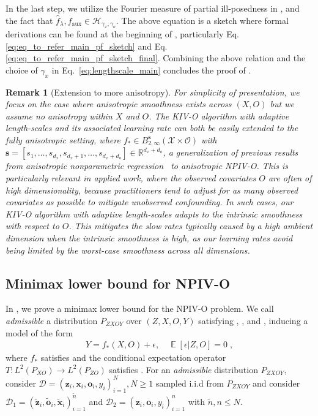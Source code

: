 \documentclass[11pt]{article}
\newcommand{\bx}{\mathbf x}
\newcommand{\bz}{\mathbf z}
\newcommand{\bo}{\mathbf o}
\newcommand{\calH}{\mathcal{H}}
\newcommand{\calO}{\mathcal{O}}
\newcommand{\calX}{\mathcal{X}}
\newcommand{\R}{\mathbb{R}}
\newcommand{\0}{\mathbf{0}}
\newcommand{\bs}{\boldsymbol{s}}
\DeclareMathOperator{\E}{\mathbb{E}}
\newtheorem{rem}{Remark}[section]
\begin{document}
In the last step, we utilize the Fourier measure of partial ill-posedness in , and the fact that $\hat{f}_{\lambda}, f_{\mathrm{aux}} \in \calH_{\gamma_x,\gamma_o}$.
The above equation is a sketch where formal derivations can be found at the beginning of , particularly Eq. \eqref{eq:eq_to_refer_main_pf_sketch} and Eq. \eqref{eq:eq_to_refer_main_pf_sketch_final}. 
Combining the above relation and the choice of $\gamma_x$ in Eq.~\eqref{eq:lengthscale_main} concludes the proof of .





\begin{rem}[Extension to more anisotropy]
\label{rem:extension_anisotropy}
For simplicity of presentation, we focus on the case where anisotropic smoothness exists across $(X,O)$ but we assume no anisotropy within $X$ and $O$.
The KIV-O algorithm with adaptive length-scales and its associated learning rate can both be easily extended to the fully anisotropic setting, where $f_\ast \in B_{2, \infty}^{\bs} (\calX\times\calO)$ with $\bs=[s_1, \ldots, s_{d_x}, s_{d_x+1}, \ldots, s_{d_x+d_o}]\in\R^{d_x+d_o}$, a generalization of previous results from anisotropic nonparametric regression~\citep{hang2021optimal, suzuki2021deep,hoffman2002random} to anisotropic NPIV-O. This is particularly relevant in applied work, where the observed covariates $O$ are often of high dimensionality, because practitioners tend to adjust for as many observed covariates as possible to mitigate unobserved confounding. In such cases, our KIV-O algorithm with adaptive length-scales adapts to the intrinsic smoothness with respect to $O$. This mitigates the slow rates typically caused by a high ambient dimension when the intrinsic smoothness is high, as our learning rates avoid being limited by the worst-case smoothness across all dimensions. 
\end{rem}


\subsection{Minimax lower bound for NPIV-O}
\label{sec:lower_main}
In , we prove a minimax lower bound for the NPIV-O problem. We call \emph{admissible} a distribution $P_{ZXOY}$ over $(Z, X, O, Y)$ satisfying , ,  and , inducing a model of the form
\begin{align*}
    Y = f_{\ast}(X,O) + \epsilon,\quad \E[\epsilon|Z,O] = 0 \;,
\end{align*}
where $f_{\ast}$ satisfies  and the conditional expectation operator $T : L^2(P_{XO})\to L^2(P_{ZO})$ satisfies . For an \emph{admissible} distribution $P_{ZXOY}$, consider $\mathcal{D} = (\bz_i, \bx_i, \bo_i, y_i)_{i=1}^N, N \geq 1$ sampled i.i.d from $P_{ZXOY}$ and consider $\mathcal{D}_1 = (\tilde{\bz}_i, \tilde{\bo}_i, \tilde{\bx}_i)_{i=1}^{\tilde{n}}$ and $\mathcal{D}_2 = (\bz_i, \bo_i, y_i)_{i=1}^n$ with $\tilde{n},n \leq N$. 
\end{document}
